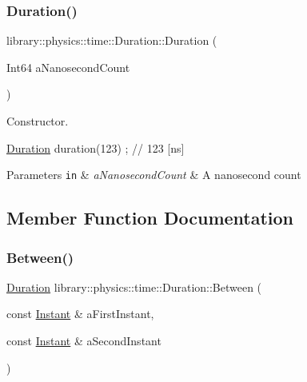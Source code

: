\subsubsection{\texorpdfstring{Duration()}{Duration()}}
{\footnotesize\ttfamily library\+::physics\+::time\+::\+Duration\+::\+Duration (\begin{DoxyParamCaption}\item[{Int64}]{a\+Nanosecond\+Count }\end{DoxyParamCaption})}



Constructor. 


\begin{DoxyCode}
\hyperlink{classlibrary_1_1physics_1_1time_1_1_duration_a0a70efcf487a841da572afcf00001f64}{Duration} duration(123) ; \textcolor{comment}{// 123 [ns]}
\end{DoxyCode}
 
\begin{DoxyParams}[1]{Parameters}
\mbox{\tt in}  & {\em a\+Nanosecond\+Count} & A nanosecond count \\
\hline
\end{DoxyParams}


\subsection{Member Function Documentation}
\mbox{\label{classlibrary_1_1physics_1_1time_1_1_duration_a7d2654965a46c6eff9d331ad8b0d9b1f}} 
\subsubsection{\texorpdfstring{Between()}{Between()}}
{\footnotesize\ttfamily \hyperlink{classlibrary_1_1physics_1_1time_1_1_duration}{Duration} library\+::physics\+::time\+::\+Duration\+::\+Between (\begin{DoxyParamCaption}\item[{const \hyperlink{classlibrary_1_1physics_1_1time_1_1_instant}{Instant} \&}]{a\+First\+Instant,  }\item[{const \hyperlink{classlibrary_1_1physics_1_1time_1_1_instant}{Instant} \&}]{a\+Second\+Instant }\end{DoxyParamCaption})\hspace{0.3cm}{\ttfamily [static]}}




